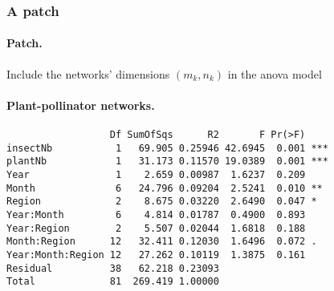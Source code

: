 \documentclass[8pt]{beamer}
\begin{document}
\begin{frame}[fragile] \frametitle{A patch}

  \paragraph{Patch.} Include the networks' dimensions $(m_k, n_k)$ in the anova model
  
  \bigskip \pause
  \paragraph{Plant-pollinator networks.}   
\begin{verbatim}
                  Df SumOfSqs      R2       F Pr(>F)    
insectNb           1   69.905 0.25946 42.6945  0.001 ***
plantNb            1   31.173 0.11570 19.0389  0.001 ***
Year               1    2.659 0.00987  1.6237  0.209    
Month              6   24.796 0.09204  2.5241  0.010 ** 
Region             2    8.675 0.03220  2.6490  0.047 *  
Year:Month         6    4.814 0.01787  0.4900  0.893    
Year:Region        2    5.507 0.02044  1.6818  0.188    
Month:Region      12   32.411 0.12030  1.6496  0.072 .  
Year:Month:Region 12   27.262 0.10119  1.3875  0.161    
Residual          38   62.218 0.23093                   
Total             81  269.419 1.00000                   
\end{verbatim}

\end{frame}

\end{document}
